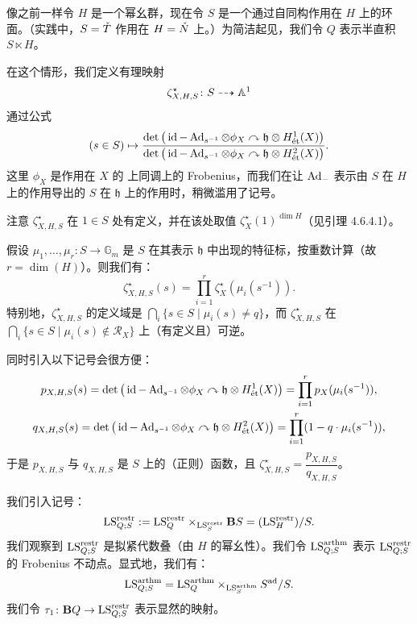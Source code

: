 
像之前一样令 $H$ 是一个幂幺群，现在令 $S$ 是一个通过自同构作用在 $H$ 上的环面。（实践中，$S=\bT$ 作用在 $H=\bN$ 上。）为简洁起见，我们令 $Q$ 表示半直积 $S\ltimes H$。

在这个情形，我们定义有理映射
\[
  \zeta^{\star}_{X,H,S}\colon S\dashrightarrow\A^1
\]
通过公式
\[
  (s\in S)\mapsto
  \frac{\det\big(\id-\Ad_{s^{-1}}\otimes\phi_X\curvearrowright\mathfrak{h}\otimes H^1_{\et}(X)\big)}
       {\det\big(\id-\Ad_{s^{-1}}\otimes\phi_X\curvearrowright\mathfrak{h}\otimes H^2_{\et}(X)\big)}.
\]
这里 $\phi_X$ 是作用在 $X$ 的 \et{} 上同调上的 Frobenius，而我们在让 $\Ad_{-}$ 表示由 $S$ 在 $H$ 上的作用导出的 $S$ 在 $\mathfrak{h}$ 上的作用时，稍微滥用了记号。

\begin{remark}
注意 $\zeta^{\star}_{X,H,S}$ 在 $1\in S$ 处有定义，并在该处取值 $\zeta^{\star}_X(1)^{\dim H}$（见引理 4.6.4.1）。
\end{remark}

\begin{remark}
假设 $\mu_1,\dots,\mu_r\colon S\to\mathbb{G}_m$ 是 $S$ 在其表示 $\mathfrak{h}$ 中出现的特征标，按重数计算（故 $r=\dim(H)$）。则我们有：
\[
  \zeta^{\star}_{X,H,S}(s)=\prod_{i=1}^{r}\zeta^{\star}_X(\mu_i(s^{-1})).
\]
特别地，$\zeta^{\star}_{X,H,S}$ 的定义域是 $\bigcap_i\{s\in S\mid\mu_i(s)\neq q\}$，而 $\zeta^{\star}_{X,H,S}$ 在 $\bigcap_i\{s\in S\mid\mu_i(s)\notin\mathcal{R}_X\}$ 上（有定义且）可逆。
\end{remark}

同时引入以下记号会很方便：
\[
\begin{gathered}
  p_{X,H,S}(s)=\det\big(\id-\Ad_{s^{-1}}\otimes\phi_X\curvearrowright\mathfrak{h}\otimes H^1_{\et}(X)\big)
  =\prod_{i=1}^{r}p_X(\mu_i(s^{-1})),\\
  q_{X,H,S}(s)=\det\big(\id-\Ad_{s^{-1}}\otimes\phi_X\curvearrowright\mathfrak{h}\otimes H^2_{\et}(X)\big)
  =\prod_{i=1}^{r}(1-q\cdot\mu_i(s^{-1})),
\end{gathered}
\]
于是 $p_{X,H,S}$ 与 $q_{X,H,S}$ 是 $S$ 上的（正则）函数，且
$\zeta^{\star}_{X,H,S}=\dfrac{p_{X,H,S}}{q_{X,H,S}}$。

我们引入记号：
\[
  \LS^{\restr}_{Q;S}:=\LS^{\restr}_{Q}\times_{\LS^{\restr}_{S}}\mathbf{B}S
  =(\LS^{\restr}_{H})/S.
\]
我们观察到 $\LS^{\restr}_{Q;S}$ 是拟紧代数叠（由 $H$ 的幂幺性）。我们令 $\LS^{\arthm}_{Q;S}$ 表示 $\LS^{\restr}_{Q;S}$ 的 Frobenius 不动点。显式地，我们有：
\[
  \LS^{\arthm}_{Q;S}=\LS^{\arthm}_{Q}\times_{\LS^{\arthm}_{S}}S^{\ad}/S.
\]
我们令 $\tau_1\colon\mathbf{B}Q\to\LS^{\restr}_{Q;S}$ 表示显然的映射。

